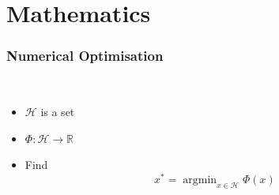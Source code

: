 \documentclass[aspectratio=169]{beamer}
\newcommand{\HH}{\mathcal{H}}
\newcommand{\RR}{\mathbb{R}}
\newcommand{\rd}{\mathbb{R}^d}
\DeclareMathOperator*{\argmin}{argmin}
\begin{document}
	\setcounter{framenumber}{0}
	\setcounter{showProgressBar}{1}
	\setcounter{showSlideNumbers}{1}
	\section{Mathematics}
		
		\begin{frame}
			\frametitle{Numerical Optimisation}
			\quad \\
			\begin{itemize}
			\item $\HH$ is a set
			\item $\Phi: \HH\to\RR$
			\item Find \begin{equation}\nonumber x^* = \argmin_{x\in\HH}\Phi(x)\end{equation}
			\end{itemize}
			
			
			
		\end{frame}
\end{document}
